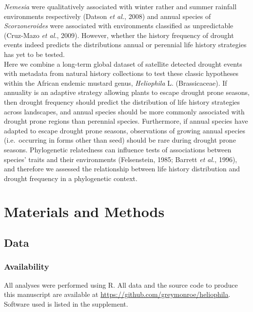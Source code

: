 \documentclass[man,floatsintext]{apa6}
\theoremstyle{definition}
\theoremstyle{definition}
\theoremstyle{definition}
\theoremstyle{remark}
\begin{document}
\emph{Nemesia} were qualitatively associated with winter rather and
summer rainfall environments respectively (Datson \emph{et al.}, 2008)
and annual species of \emph{Scorzoneroides} were associated with
environments classified as unpredictable (Cruz-Mazo \emph{et al.},
2009). However, whether the history frequency of drought events indeed
predicts the distributions annual or perennial life history strategies
has yet to be tested.\\
Here we combine a long-term global dataset of satellite detected drought
events with metadata from natural history collections to test these
classic hypotheses within the African endemic mustard genus,
\emph{Heliophila} L. (Brassicaceae). If annuality is an adaptive
strategy allowing plants to escape drought prone seasons, then drought
frequency should predict the distribution of life history strategies
across landscapes, and annual species should be more commonly associated
with drought prone regions than perennial species. Furthermore, if
annual species have adapted to escape drought prone seasons,
observations of growing annual species (i.e.~occurring in forms other
than seed) should be rare during drought prone seasons. Phylogenetic
relatedness can influence tests of associations between species' traits
and their environments (Felsenstein, 1985; Barrett \emph{et al.}, 1996),
and therefore we assessed the relationship between life history
distribution and drought frequency in a phylogenetic context.

\hypertarget{materials-and-methods}{%
\section{Materials and Methods}\label{materials-and-methods}}

\hypertarget{data}{%
\subsection{Data}\label{data}}

\hypertarget{availability}{%
\subsubsection{Availability}\label{availability}}

All analyses were performed using R. All data and the source code to
produce this manuscript are available at
\url{https://github.com/greymonroe/heliophila}. Software used is listed
in the supplement.
\end{document}
